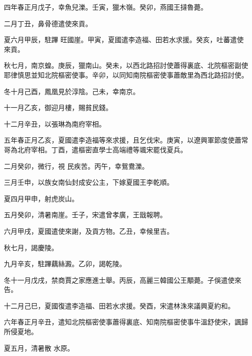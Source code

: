 \begin{pinyinscope}
 四年春正月戊子，幸魚兒濼。壬寅，獵木嶺。癸卯，燕國王撻魯薨。



 二月丁丑，鼻骨德遣使來貢。



 夏六月甲辰，駐蹕
 旺國崖。甲寅，夏國遣李造福、田若水求援。癸亥，吐蕃遣使來貢。



 秋七月，南京蝗。庚辰，獵南山。癸未，以西北路招討使蕭得裏底、北院樞密副使耶律慎思並知北院樞密使事。辛卯，以同知南院樞密使事蕭敵里為西北路招討使。



 冬十月己酉，鳳凰見於淳陰。己未，幸南京。



 十一月乙亥，御迎月樓，賜貧民錢。



 十二月辛丑，以張琳為南府宰相。



 五年春正月乙亥，夏國遣李造福等來求援，且乞伐宋。庚寅，以遼興軍節度使蕭常哥為北府宰相。丁酉，遣樞密直學士高端禮等颯宋罷伐夏兵。



 二月癸卯，微行，視
 民疾苦。丙午，幸鴛鴦濼。



 三月壬申，以族女南仙封成安公主，下嫁夏國王李乾順。



 夏四月甲申，射虎炭山。



 五月癸卯，清暑南崖。壬子，宋遣曾孝廣，王戩報聘。



 六月甲戌，夏國遣使來謝，及貢方物。乙丑，幸候里吉。



 秋七月，謁慶陵。



 九月辛亥，駐蹕藕絲澱。乙卯，謁乾陵。



 冬十一月戊戌，禁商賈之家應進士舉。丙辰，高麗三韓國公王顒薨。子俁遣使來告。



 十二月己巳，夏國復遣李造福、田若水求援。癸酉，宋遣林洙來議興夏約和。



 六年春正月辛丑，遣知北院樞密使事蕭得裏底、知南院樞密使事牛溫舒使宋，諷歸所侵夏地。



 夏五月，清暑散
 水原。




\end{pinyinscope}

